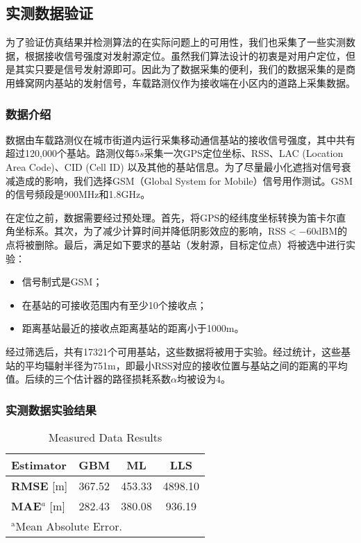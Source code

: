 \subsection{实测数据验证}

为了验证仿真结果并检测算法的在实际问题上的可用性，我们也采集了一些实测数据，根据接收信号强度对发射源定位。虽然我们算法设计的初衷是对用户定位，但是其实只要是信号发射源即可。因此为了数据采集的便利，我们的数据采集的是商用蜂窝网内基站的发射信号，车载路测仪作为接收端在小区内的道路上采集数据。

\subsubsection{数据介绍}

数据由车载路测仪在城市街道内运行采集移动通信基站的接收信号强度，其中共有超过120,000个基站。路测仪每$5s$采集一次GPS定位坐标、RSS、LAC (Location Area Code)、CID (Cell ID) 以及其他的基站信息。为了尽量最小化遮挡对信号衰减造成的影响，我们选择GSM（Global System for Mobile）信号用作测试。GSM的信号频段是900MHz和1.8GHz。

在定位之前，数据需要经过预处理。首先，将GPS的经纬度坐标转换为笛卡尔直角坐标系。其次，为了减少计算时间并降低阴影效应的影响，RSS$<-60$dBM的点将被删除。最后，满足如下要求的基站（发射源，目标定位点）将被选中进行实验：
\begin{itemize}
	\item 信号制式是GSM；
	\item 在基站的可接收范围内有至少10个接收点；
	\item 距离基站最近的接收点距离基站的距离小于1000m。
\end{itemize}

经过筛选后，共有17321个可用基站，这些数据将被用于实验。经过统计，这些基站的平均辐射半径为751m，即最小RSS对应的接收位置与基站之间的距离的平均值。后续的三个估计器的路径损耗系数$\alpha$均被设为4。

\subsubsection{实测数据实验结果}

\begin{table}[tbp]
	\caption{Measured Data Results}
	\begin{center}
		\begin{tabular}{l|c|c|c}
			\hline
			\textbf{Estimator} & \textbf{GBM} & \textbf{ML} & \textbf{LLS} \\
			\hline
			\textbf{RMSE} [m] & 367.52 & 453.33 & 4898.10 \\
			\hline
			\textbf{MAE}$^{a}$ [m] & 282.43 & 380.08 & 936.19 \\
			\hline
			\multicolumn{3}{l}{$^{\mathrm{a}}$Mean Absolute Error.}
		\end{tabular}
		\label{tab:transmitter}
	\end{center}
\end{table}

